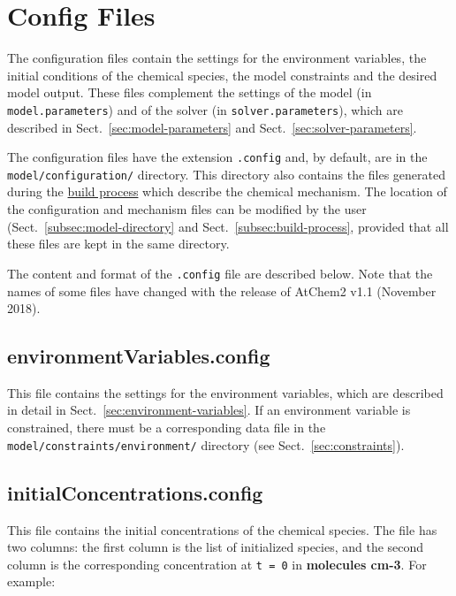 \section{Config Files} \label{sec:config-files}

The configuration files contain the settings for the environment
variables, the initial conditions of the chemical species, the model
constraints and the desired model output. These files complement the
settings of the model (in \texttt{model.parameters}) and of the solver
(in \texttt{solver.parameters}), which are described in
Sect.~\ref{sec:model-parameters} and Sect.~\ref{sec:solver-parameters}.

The configuration files have the extension \texttt{.config} and, by
default, are in the \texttt{model/configuration/} directory. This
directory also contains the files generated during the
\hyperref[subsec:build-process]{build process} which describe the
chemical mechanism. The location of the configuration and mechanism
files can be modified by the user (Sect.~\ref{subsec:model-directory}
and Sect.~\ref{subsec:build-process}, provided that all these files
are kept in the same directory.

The content and format of the \texttt{.config} file are described
below. Note that the names of some files have changed with the release
of AtChem2 v1.1 (November 2018).

\subsection{environmentVariables.config} \label{subsec:environmentvariables}

This file contains the settings for the environment variables, which
are described in detail in Sect.~\ref{sec:environment-variables}. If
an environment variable is constrained, there must be a corresponding
data file in the \texttt{model/constraints/environment/} directory
(see Sect.~\ref{sec:constraints}).

\subsection{initialConcentrations.config} \label{subsec:initialconcentrations}

This file contains the initial concentrations of the chemical species.
The file has two columns: the first column is the list of initialized
species, and the second column is the corresponding concentration at
\texttt{t\ =\ 0} in \textbf{molecules cm-3}. For example:

